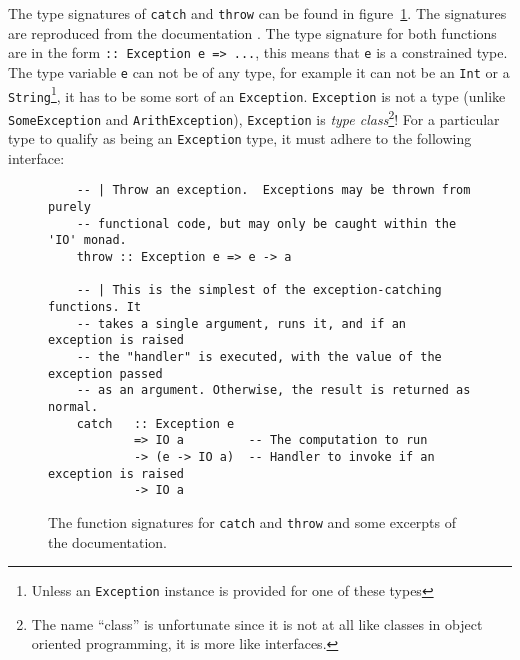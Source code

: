 The type signatures of \texttt{catch} and \texttt{throw} can be found in
figure~\ref{fig:catch_and_throw}. The signatures are reproduced from the
documentation \cite{hackage_base_control_exception}. The type signature
for both functions are in the form \texttt{:: Exception e => ...}, this
means that \texttt{e} is a constrained type. The type variable
\texttt{e} can not be of any type, for example it can not be an \texttt{Int} or a
\texttt{String}\footnote{Unless an \texttt{Exception} instance is provided for
  one of these types}, it has to be some sort of an \texttt{Exception}.
\texttt{Exception} is not a type (unlike \texttt{SomeException} and
\texttt{ArithException}), \texttt{Exception} is
\emph{type class}\footnote{The name ``class'' is unfortunate since
it is not at all like classes in object oriented programming, it is
more like interfaces.}! For a particular type to qualify as being an
\texttt{Exception} type, it must adhere to the following interface:

\begin{figure}
\begin{mdframed}
  \begin{verbatim}
    -- | Throw an exception.  Exceptions may be thrown from purely
    -- functional code, but may only be caught within the 'IO' monad.
    throw :: Exception e => e -> a

    -- | This is the simplest of the exception-catching functions. It
    -- takes a single argument, runs it, and if an exception is raised
    -- the "handler" is executed, with the value of the exception passed
    -- as an argument. Otherwise, the result is returned as normal.
    catch   :: Exception e
            => IO a         -- The computation to run
            -> (e -> IO a)  -- Handler to invoke if an exception is raised
            -> IO a
  \end{verbatim}
  \caption{The function signatures for \texttt{catch} and
    \texttt{throw} and some excerpts of the documentation.}
  \label{fig:catch_and_throw}
\end{mdframed}
\end{figure}

